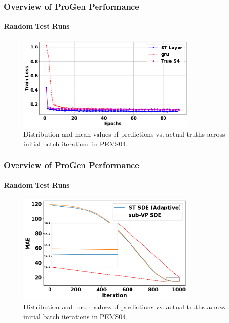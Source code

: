 \documentclass[light]{lutbeamer} %
\begin{document}
\begin{frame}
    \frametitle{Overview of ProGen Performance}
    \framesubtitle{Random Test Runs}

    \begin{figure}[ht]
        \centering
        \includegraphics[width=0.8\textwidth]{figures/train_loss.png        }
        \caption{Distribution and mean values of predictions vs. actual truths across initial batch iterations in PEMS04.}
    \end{figure}
\end{frame}

\begin{frame}
    \frametitle{Overview of ProGen Performance}
    \framesubtitle{Random Test Runs}

    \begin{figure}[ht]
        \centering
        \includegraphics[width=0.8\textwidth]{figures/mae_stsde_subvpsde.png        }
        \caption{Distribution and mean values of predictions vs. actual truths across initial batch iterations in PEMS04.}
    \end{figure}
\end{frame}
\end{document}
